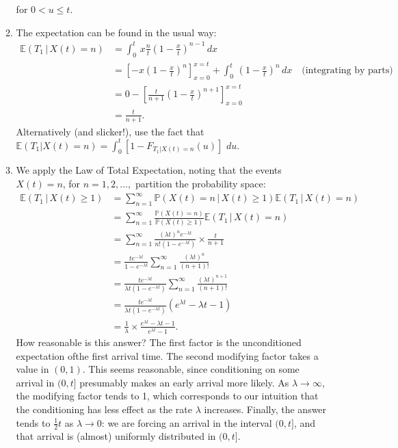 \documentclass[11pt,a4paper]{article}
\begin{document}
\begin{enumerate}
\begin{enumerate}
$$            $$
            for $0<u\leq t$.
            \item The expectation can be found in the usual way:
            \begin{align*}
                \mathbb{E}(T_1\,|\,X(t)=n)
                &= \int_0^t\, x\frac{n}{t}\left(1-\frac{x}{t}\right)^{n-1}\, dx\\
                &= \left[-x\left(1-\frac{x}{t}\right)^n\right]_{x=0}^{x=t}+\int_0^t\, \left(1-\frac{x}{t}\right)^n\, dx\quad \text{(integrating by parts)}\\
                &= 0-\left[\frac{t}{n+1}\left(1-\frac{x}{t}\right)^{n+1}\right]_{x=0}^{x=t}\\
                &= \frac{t}{n+1}.
            \end{align*}
            Alternatively (and slicker!), use the fact that $\mathbb{E}(T_1|X(t)=n)=\int_0^t[1-F_{T_1|X(t)=n}(u)]$ $du$.
            \item We apply the Law of Total Expectation, noting that the events $X (t) = n$, for $n = 1,2,\ldots,$ partition the probability space:
            \begingroup
            \allowdisplaybreaks
            \begin{align*}
                \mathbb{E}(T_1\,|\, X(t)\geq 1)
                &= \sum_{n=1}^\infty \mathbb{P}(X(t)=n\,|\, X(t)\geq 1)\mathbb{E}(T_1\,|\, X(t)=n)\\
                &= \sum_{n=1}^\infty \frac{\mathbb{P}(X(t)=n)}{\mathbb{P}(X(t)\geq 1)}\mathbb{E}(T_1\,|\, X(t)=n)\\
                &= \sum_{n=1}^\infty \frac{(\lambda t)^ne^{-\lambda t}}{n!(1-e^{-\lambda t})}\times \frac{t}{n+1}\\
                &= \frac{te^{-\lambda t}}{1-e^{-\lambda t}}\sum_{n=1}^\infty \frac{(\lambda t)^n}{(n+1)!}\\
                &= \frac{te^{-\lambda t}}{\lambda t(1-e^{-\lambda t})}\sum_{n=1}^\infty \frac{(\lambda t)^{n+1}}{(n+1)!}\\
                &= \frac{te^{-\lambda t}}{\lambda t(1-e^{-\lambda t})}\left(e^{\lambda t}-\lambda t -1\right)\\
                &= \frac{1}{\lambda}\times \frac{e^{\lambda t}-\lambda t -1}{e^{\lambda t}-1}.
            \end{align*}
            \endgroup
            How reasonable is this answer? The first factor is the unconditioned expectation ofthe first arrival time. The second modifying factor takes a value in $(0, 1)$. This seems reasonable, since conditioning on some arrival in $(0, t]$ presumably makes an early arrival more likely. As $\lambda \to \infty$, the modifying factor tends to 1, which corresponds to our intuition that the conditioning has less effect as the rate $\lambda$ increases. Finally, the answer tends to $\tfrac{1}{2}t$ as $\lambda \to 0$: we are forcing an arrival in the interval $(0, t]$, and that arrival is (almost) uniformly distributed in $(0, t]$. 
        \end{enumerate}

        
    \end{enumerate}
\end{document}
